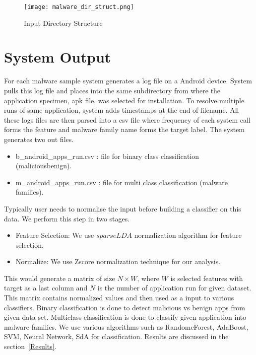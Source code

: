 \begin{figure}[h]
\centering
\texttt{[image: malware\_dir\_struct.png]}
\caption{Input Directory Structure}
\label{fig:malware_dir_struct}
\end{figure}

\section{System Output}
\label{System Output}
For each malware sample system generates a log file on a Android device. System pulls this log file and places into the same subdirectory from where the application specimen, apk file, was selected for installation. To resolve multiple runs of same application, system adds timestamps at the end of filename. All these logs files are then parsed into a csv file where frequency of each system call forms the feature and malware family name forms the target label. The system generates two out files.
\begin{itemize}
\item b\_android\_apps\_run.csv : file for binary class classification (malicious\/benign).
\item m\_android\_apps\_run.csv : file for multi class classification (malware families).
\end{itemize}
Typically user needs to normalise the input before building a classifier on this data. We perform this step in two stages. 
\begin{itemize}
\item Feature Selection: We use $sparseLDA$ normalization algorithm for feature selection.
\item Normalize: We use Zscore normalization technique for our analysis.
\end{itemize}

This would generate a matrix of size \(N \times W\), where \(W\) is selected features with target as a last column and \(N\) is the number of application run for given dataset. This matrix contains normalized values and then used as a input to various classifiers. Binary classification is done to detect malicious vs benign apps from given data set. Multiclass classification is done to classify given application into malware families. We use various algorithms such as RandomeForest, AdaBoost, SVM, Neural Network, SdA for classification. Results are discussed in the section~\ref{Results}.
